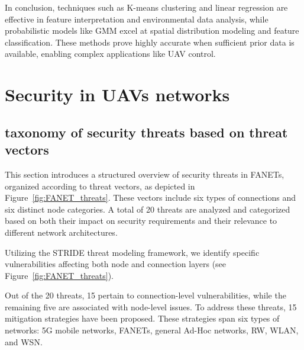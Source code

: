 In conclusion, techniques such as K-means clustering and linear regression are effective in feature interpretation and environmental data analysis, while probabilistic models like GMM excel at spatial distribution modeling and feature classification. These methods prove highly accurate when sufficient prior data is available, enabling complex applications like UAV control.





\section{Security in UAVs networks}


\subsection{taxonomy of security threats based on threat vectors}

    This section introduces a structured overview of security threats in FANETs, organized according to threat vectors, as depicted in Figure~\ref{fig:FANET_threats}. These vectors include six types of connections and six distinct node categories. A total of 20 threats are analyzed and categorized based on both their impact on security requirements and their relevance to different network architectures.
    
    Utilizing the STRIDE threat modeling framework, we identify specific vulnerabilities affecting both node and connection layers (see Figure~\ref{fig:FANET_threats}). 
    
    Out of the 20 threats, 15 pertain to connection-level vulnerabilities, while the remaining five are associated with node-level issues. To address these threats, 15 mitigation strategies have been proposed. These strategies span six types of networks: 5G mobile networks, FANETs, general Ad-Hoc networks, RW, WLAN, and WSN.
    
    


